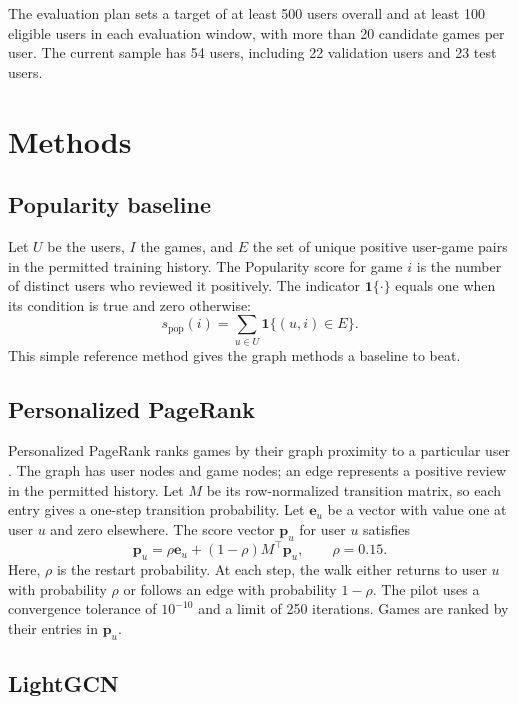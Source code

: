 \documentclass[11pt]{article}
\begin{document}
The evaluation plan sets a target of at least 500 users overall and at least 100 eligible users in each evaluation window, with more than 20 candidate games per user. The current sample has 54 users, including 22 validation users and 23 test users.

\section{Methods}

\subsection{Popularity baseline}

Let $U$ be the users, $I$ the games, and $E$ the set of unique positive user-game pairs in the permitted training history. The Popularity score for game $i$ is the number of distinct users who reviewed it positively. The indicator $\mathbf{1}\{\cdot\}$ equals one when its condition is true and zero otherwise:
\[
  s_{\mathrm{pop}}(i)=\sum_{u\in U}\mathbf{1}\{(u,i)\in E\}.
\]
This simple reference method gives the graph methods a baseline to beat.

\subsection{Personalized PageRank}

Personalized PageRank ranks games by their graph proximity to a particular user \cite{haveliwala}. The graph has user nodes and game nodes; an edge represents a positive review in the permitted history. Let $M$ be its row-normalized transition matrix, so each entry gives a one-step transition probability. Let $\mathbf{e}_u$ be a vector with value one at user $u$ and zero elsewhere. The score vector $\mathbf{p}_u$ for user $u$ satisfies
\[
  \mathbf{p}_u=\rho\mathbf{e}_u+(1-\rho)M^\top\mathbf{p}_u,
  \qquad \rho=0.15.
\]
Here, $\rho$ is the restart probability. At each step, the walk either returns to user $u$ with probability $\rho$ or follows an edge with probability $1-\rho$. The pilot uses a convergence tolerance of $10^{-10}$ and a limit of 250 iterations. Games are ranked by their entries in $\mathbf{p}_u$.

\subsection{LightGCN}
\end{document}
